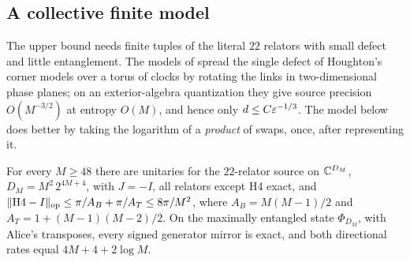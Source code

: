 \subsection{A collective finite model}\label{sec:point-collective}

The upper bound needs finite tuples of the literal $22$ relators with small defect and little entanglement. The models of
\cite[Proposition~6.5]{DM-H3} spread the single defect of Houghton's corner models over a torus of clocks by rotating the links in
two-dimensional phase planes; on an exterior-algebra quantization they give source precision $O(M^{-3/2})$ at entropy $O(M)$, and
hence only $d\le C\varepsilon^{-1/3}$. The model below does better by taking the logarithm of a \emph{product} of swaps, once, after
representing it.

\begin{proposition}\label{prop:collective}
For every $M\ge48$ there are unitaries for the $22$-relator source on $\mathbb C^{D_M}$, $D_M=M^2\,2^{4M+4}$, with $J=-I$, all relators
except H4 exact, and $\lVert \mathrm{H4}-I\rVert_{\mathrm{op}}\le\pi/A_B+\pi/A_T\le8\pi/M^2$, where $A_B=M(M-1)/2$ and $A_T=1+(M-1)(M-2)/2$. On the maximally
entangled state $\Phi_{D_M}$, with Alice's transposes, every signed generator mirror is exact, and both directional rates equal
$4M+4+2\log M$.
\end{proposition}

